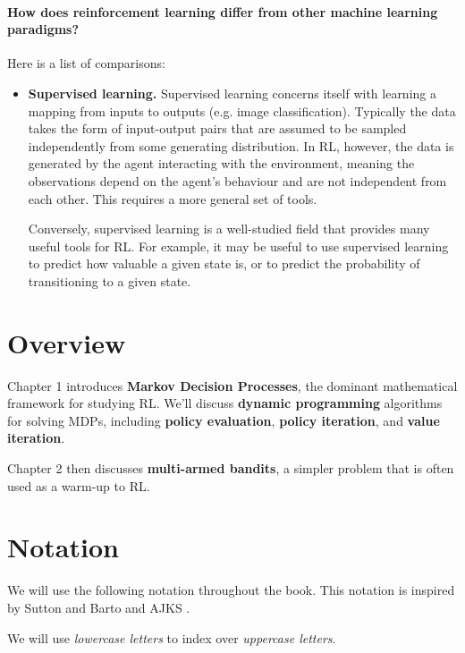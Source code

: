 \documentclass[\main/main]{subfiles}
\begin{document}
\paragraph{How does reinforcement learning differ from other machine learning paradigms?} Here is a list of comparisons:

\begin{itemize}
    \item \textbf{Supervised learning.} Supervised learning concerns itself with learning a mapping from inputs to outputs (e.g. image classification). Typically the data takes the form of input-output pairs that are assumed to be sampled independently from some generating distribution. In RL, however, the data is generated by the agent interacting with the environment, meaning the observations depend on the agent's behaviour and are not independent from each other. This requires a more general set of tools.

    Conversely, supervised learning is a well-studied field that provides many useful tools for RL. For example, it may be useful to use supervised learning to predict how valuable a given state is, or to predict the probability of transitioning to a given state.
\end{itemize}

\section{Overview}

Chapter 1 introduces \textbf{Markov Decision Processes}, the dominant mathematical framework for studying RL. We'll discuss \textbf{dynamic programming} algorithms for solving MDPs, including \textbf{policy evaluation}, \textbf{policy iteration}, and \textbf{value iteration}.

Chapter 2 then discusses \textbf{multi-armed bandits}, a simpler problem that is often used as a warm-up to RL.

\section{Notation}

We will use the following notation throughout the book. This notation is inspired by Sutton and Barto  and AJKS .

We will use \emph{lowercase letters} to index over \emph{uppercase letters}.

\end{document}
